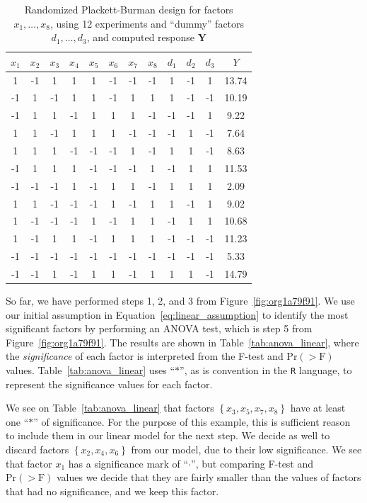 \documentclass[conference]{IEEEtran}
\begin{document}
\begin{table}[b]
\centering
\caption{Randomized Plackett-Burman design for factors $x_1, \dots, x_8$, using 12 experiments and ``dummy'' factors $d_1, \dots, d_3$, and computed response $\mathbf{Y}$}
\label{tab:plackett}
\begingroup\scriptsize
\begin{tabular}{cccccccccccc}
  \toprule
$x_1$ & $x_2$ & $x_3$ & $x_4$ & $x_5$ & $x_6$ & $x_7$ & $x_8$ & $d_1$ & $d_2$ & $d_3$ & $Y$ \\
  \midrule
1 & -1 & 1 & 1 & 1 & -1 & -1 & -1 & 1 & -1 & 1 & 13.74 \\
  -1 & 1 & -1 & 1 & 1 & -1 & 1 & 1 & 1 & -1 & -1 & 10.19 \\
  -1 & 1 & 1 & -1 & 1 & 1 & 1 & -1 & -1 & -1 & 1 & 9.22 \\
  1 & 1 & -1 & 1 & 1 & 1 & -1 & -1 & -1 & 1 & -1 & 7.64 \\
  1 & 1 & 1 & -1 & -1 & -1 & 1 & -1 & 1 & 1 & -1 & 8.63 \\
  -1 & 1 & 1 & 1 & -1 & -1 & -1 & 1 & -1 & 1 & 1 & 11.53 \\
  -1 & -1 & -1 & 1 & -1 & 1 & 1 & -1 & 1 & 1 & 1 & 2.09 \\
  1 & 1 & -1 & -1 & -1 & 1 & -1 & 1 & 1 & -1 & 1 & 9.02 \\
  1 & -1 & -1 & -1 & 1 & -1 & 1 & 1 & -1 & 1 & 1 & 10.68 \\
  1 & -1 & 1 & 1 & -1 & 1 & 1 & 1 & -1 & -1 & -1 & 11.23 \\
  -1 & -1 & -1 & -1 & -1 & -1 & -1 & -1 & -1 & -1 & -1 & 5.33 \\
  -1 & -1 & 1 & -1 & 1 & 1 & -1 & 1 & 1 & 1 & -1 & 14.79 \\
   \bottomrule
\end{tabular}
\endgroup
\end{table}

So far, we have performed steps 1, 2, and 3 from
Figure~\ref{fig:org1a79f91}. We use our initial assumption in
Equation~\eqref{eq:linear_assumption} to identify the most significant
factors by performing an ANOVA test, which is step 5 from
Figure~\ref{fig:org1a79f91}. The results are shown in
Table~\ref{tab:anova_linear}, where the \emph{significance} of each factor is
interpreted from the F-test and \(\text{Pr}(>\text{F})\) values.
Table~\ref{tab:anova_linear} uses ``\(*\)'', as is convention in the
\texttt{R} language, to represent the significance values for each factor.

We see on Table~\ref{tab:anova_linear} that factors
\(\left\{x_3,x_5,x_7,x_8\right\}\) have at least one ``\(*\)'' of significance. For
the purpose of this example, this is sufficient reason to include them in our
linear model for the next step. We decide as well to discard factors
\(\left\{x_2,x_4,x_6\right\}\) from our model, due to their low significance. We
see that factor \(x_1\) has a significance mark of ``\(\cdot\)'', but comparing F-test
and \(\text{Pr}(>\text{F})\) values we decide that they are fairly
smaller than the values of factors that had no significance, and we keep this
factor.
\end{document}
